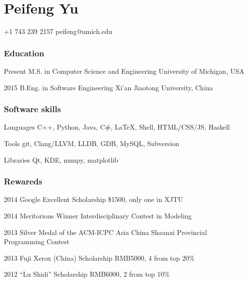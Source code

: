\documentclass{tccv}
\begin{document}
\part{Peifeng Yu}

    {+1 743 239 2157}
    {peifeng@umich.edu}

\section{Education}

\begin{yearlist}

\item{Present}
     {M.S. in Computer Science and \newline Engineering}
     {University of Michigan, USA}

\item{2015}
     {B.Eng. in Software Engineering}
     {Xi'an Jiaotong University, China}

\end{yearlist}


\section{Software skills}

\begin{factlist}

\item{Languages}
     {C++, Python, Java, C\#, \LaTeX, Shell, HTML/CSS/JS, Haskell}

\item{Tools}
     {git, Clang/LLVM, LLDB, GDB, MySQL, Subversion}

\item{Libraries}
     {Qt, KDE, numpy, matplotlib}
\end{factlist}

\section{Rewareds}

\begin{yearlist}
    \item{2014}
         {Google Excellent Scholarship}
         {\$1500, only one in XJTU}
    \item{2014}
         {Meritorious Winner}
         {Interdisciplinary Contest in Modeling}
    \item{2013}
         {Silver Medal of the ACM-ICPC}
         {Asia China Shaanxi Provincial Programming Contest}
    \item{2013}
         {Fuji Xerox (China) Scholarship}
         {RMB5000, 4 from top 20\%}
    \item{2012}
         {``Lu Shidi'' Scholarship}
         {RMB6000, 2 from top 10\%}
\end{yearlist}
\end{document}
